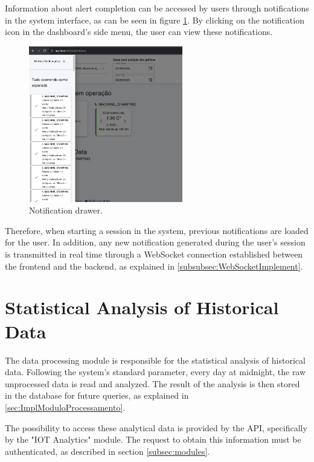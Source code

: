 Information about alert completion can be accessed by users through notifications in the system interface, as can be seen in figure \ref{fig:notificationDrawer}. By clicking on the notification icon in the dashboard's side menu, the user can view these notifications.

\begin{figure}[htbp]
	\centering
	\includegraphics[width=0.6\textwidth]{images/notification.png}
	\caption{Notification drawer.}
	\label{fig:notificationDrawer}
\end{figure}


Therefore, when starting a session in the system, previous notifications are loaded for the user. In addition, any new notification generated during the user's session is transmitted in real time through a WebSocket connection established between the frontend and the backend, as explained in \ref{subsubsec:WebSocketImplement}.


\section[Statistical Analysis of Historical Data]{Statistical Analysis of Historical Data}\label{sec:histicalGraphs}

The data processing module is responsible for the statistical analysis of historical data. Following the system's standard parameter, every day at midnight, the raw unprocessed data is read and analyzed. The result of the analysis is then stored in the database for future queries, as explained in \ref{sec:ImplModuloProcessamento}.

The possibility to access these analytical data is provided by the \gls{API}, specifically by the "IOT Analytics" module. The request to obtain this information must be authenticated, as described in section \ref{subsec:modules}.

